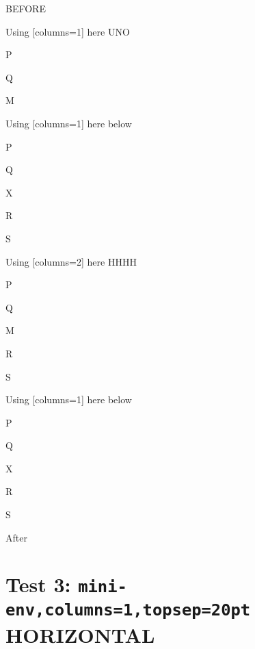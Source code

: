 \documentclass[10pt]{article}
\begin{document}
BEFORE
\begin{enumext}[columns=2]
\item Using [columns=1] here UNO
  \begin{enumext}[columns=1,topsep=0pt]%
     \item  P \item Q \item M %
  \end{enumext}

\item Using [columns=1] here below
\begin{enumext}[columns=1]%
     \item  P \item Q \item X  \item R \item S
  \end{enumext}

\columnbreak

\item Using [columns=2] here HHHH
  \begin{enumext}[columns=2,topsep=0pt]%
    \item  P \item Q \item M \item R \item S
  \end{enumext}

\item Using [columns=1] here below
\begin{enumext}[columns=1]%
     \item  P \item Q \item X  \item R \item S
  \end{enumext}

\end{enumext}
After

\section{Test 3: \texttt{mini-env,columns=1,topsep=20pt} HORIZONTAL}
\end{document}
